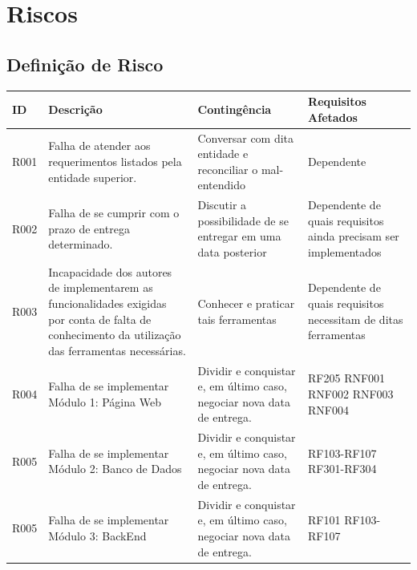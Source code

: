 \chapter{Riscos}

\section{Definição de Risco}
\begin{tabular}{>{\raggedright}p{1cm}>{\raggedright}p{5cm}>{\raggedright}p{5cm}>{\raggedright}p{4.5cm}}
\toprule
  \textbf{ID} & \textbf{Descrição} & \textbf{Contingência} & \textbf{Requisitos Afetados} \tabularnewline 
\midrule
  R001 & Falha de atender aos requerimentos listados pela entidade superior. & Conversar com dita entidade e reconciliar o mal-entendido & Dependente \tabularnewline \hline 
  R002 & Falha de se cumprir com o prazo de entrega determinado.& Discutir a possibilidade de se entregar em uma data posterior & Dependente de quais requisitos ainda precisam ser implementados \tabularnewline \hline
  R003 & Incapacidade dos autores de implementarem as funcionalidades exigidas por conta de falta de conhecimento da utilização das ferramentas necessárias.& Conhecer e praticar tais ferramentas & Dependente de quais requisitos necessitam de ditas ferramentas \tabularnewline \hline
  R004 & Falha de se implementar Módulo 1: Página Web & Dividir e conquistar e, em último caso, negociar nova data de entrega. & RF205 RNF001 RNF002 RNF003 RNF004\tabularnewline \hline 
  R005 & Falha de se implementar Módulo 2: Banco de Dados & Dividir e conquistar e, em último caso, negociar nova data de entrega. & RF103-RF107 RF301-RF304\tabularnewline \hline  
  R005 & Falha de se implementar Módulo 3: BackEnd & Dividir e conquistar e, em último caso, negociar nova data de entrega. & RF101 RF103-RF107 \tabularnewline 
\bottomrule 
\end{tabular}

